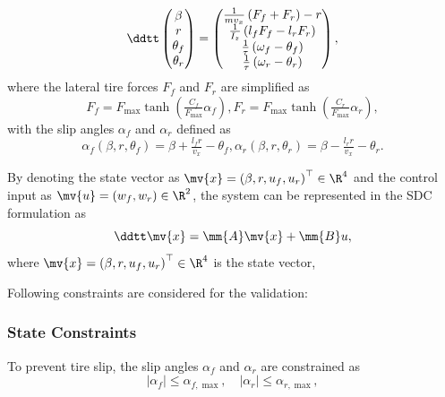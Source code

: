\documentclass[letterpaper, 10 pt, conference]{ieeeconf}
\begin{document}
\begin{equation}
    \ddtt
    \begin{pmatrix}
        \beta\\
        r\\
        \theta_f\\
        \theta_r
    \end{pmatrix}
    =
    \begin{pmatrix}
        \tfrac{1}{m v_x} \left(F_f+F_r\right) - r
        \\
        \tfrac{1}{I_z} \left(l_f F_f - l_r F_r\right)
        \\
        \tfrac{1}{\tau} \left(\omega_f - \theta_f\right)
        \\
        \tfrac{1}{\tau} \left(\omega_r - \theta_r\right)
    \end{pmatrix}
    ,
\end{equation}
where the lateral tire forces $F_f$ and $F_r$ are simplified as 
\begin{equation}
    F_f = F_{\max} \tanh\left( \tfrac{C_f}{F_{\max}} \alpha_f \right)
    ,
    F_r = F_{\max} \tanh\left( \tfrac{C_r}{F_{\max}} \alpha_r \right)
    ,
\end{equation}
with the slip angles $\alpha_f$ and $\alpha_r$ defined as
\begin{equation}
    \alpha_f(\beta,r,\theta_f) = \beta + \tfrac{l_f r}{v_x} - \theta_f
    ,
    \alpha_r(\beta,r,\theta_r) = \beta - \tfrac{l_r r}{v_x} - \theta_r
    .
\end{equation}

By denoting the state vector as $\mv{x}=\left(\beta,r,u_f,u_r\right)^\top\in\R^4$ and the control input as $\mv{u}=\left(w_f,w_r\right)\in\R^2$, the system can be represented in the SDC formulation as
\begin{equation} \label{sim:state:space}
    \ddtt \mv{x}
    =
    \mm{A}\mv{x} + \mm{B} u
    ,
\end{equation}
where $\mv{x}=\left(\beta,r,u_f,u_r\right)^\top\in\R^4$ is the state vector, 

\hfill

Following constraints are considered for the validation:
\subsubsection*{State Constraints}
To prevent tire slip, the slip angles $\alpha_f$ and $\alpha_r$ are constrained as
\begin{equation}
    \vert \alpha_f \vert \leq \alpha_{f,\max}, \quad \vert \alpha_r \vert \leq \alpha_{r,\max}
    ,
\end{equation}
\end{document}
